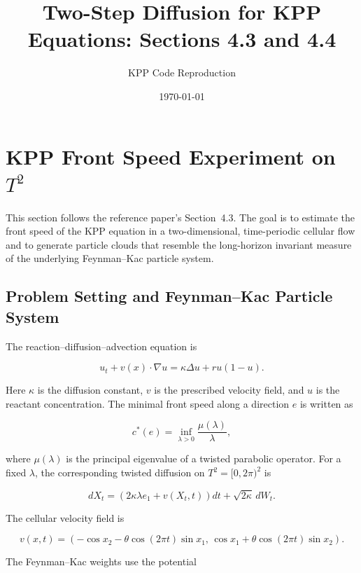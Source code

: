 \documentclass[11pt]{article}
\title{Two-Step Diffusion for KPP Equations: Sections 4.3 and 4.4}
\author{KPP Code Reproduction}
\date{\today}
\begin{document}
\maketitle

\section{KPP Front Speed Experiment on \(T^2\)}

This section follows the reference paper's Section~4.3. The goal is to
estimate the front speed of the KPP equation in a two-dimensional,
time-periodic cellular flow and to generate particle clouds that resemble the
long-horizon invariant measure of the underlying Feynman--Kac particle
system.

\subsection{Problem Setting and Feynman--Kac Particle System}

The reaction--diffusion--advection equation is

\begin{equation}
u_t+v(x)\cdot\nabla u=\kappa\Delta u+r u(1-u).
\end{equation}

Here \(\kappa\) is the diffusion constant, \(v\) is the prescribed velocity
field, and \(u\) is the reactant concentration. The minimal front speed along
a direction \(e\) is written as

\begin{equation}
c^*(e)=\inf_{\lambda>0}\frac{\mu(\lambda)}{\lambda},
\end{equation}

where \(\mu(\lambda)\) is the principal eigenvalue of a twisted parabolic
operator. For a fixed \(\lambda\), the corresponding twisted diffusion on
\(T^2=[0,2\pi)^2\) is

\begin{equation}
dX_t=\left(2\kappa\lambda e_1+v(X_t,t)\right)dt+\sqrt{2\kappa}\,dW_t.
\end{equation}

The cellular velocity field is

\begin{equation}
v(x,t)=\left(-\cos x_2-\theta\cos(2\pi t)\sin x_1,\,
\cos x_1+\theta\cos(2\pi t)\sin x_2\right).
\end{equation}

The Feynman--Kac weights use the potential
\end{document}
